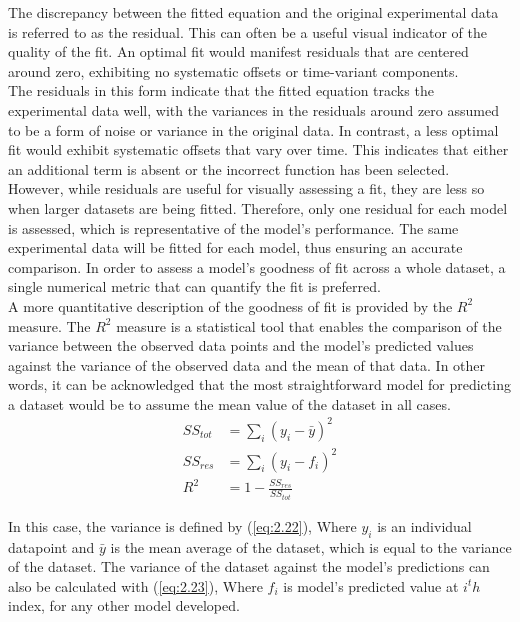 \noindent The discrepancy between the fitted equation and the original experimental data is referred to as the residual. This can often be a useful visual indicator of the quality of the fit. An optimal fit would manifest residuals that are centered around zero, exhibiting no systematic offsets or time-variant components. \\

\noindent The residuals in this form indicate that the fitted equation tracks the experimental data well, with the variances in the residuals around zero assumed to be a form of noise or variance in the original data. In contrast, a less optimal fit would exhibit systematic offsets that vary over time. This indicates that either an additional term is absent or the incorrect function has been selected. \\

\noindent However, while residuals are useful for visually assessing a fit, they are less so when larger datasets are being fitted. Therefore, only one residual for each model is assessed, which is representative of the model's performance. The same experimental data will be fitted for each model, thus ensuring an accurate comparison. In order to assess a model's goodness of fit across a whole dataset, a single numerical metric that can quantify the fit is preferred.\\

\noindent A more quantitative description of the goodness of fit is provided by the $R^2$ measure. The $R^2$ measure is a statistical tool that enables the comparison of the variance between the observed data points and the model's predicted values against the variance of the observed data and the mean of that data. In other words, it can be acknowledged that the most straightforward model for predicting a dataset would be to assume the mean value of the dataset in all cases.
\begin{align}
SS_{tot} &= \sum_{i}\left( y_i - \bar y \right)^2 \label{eq:2.22} \\
SS_{res} &= \sum_{i}\left( y_i - f_i \right)^2 \label{eq:2.23} \\
 R^2 &= 1 - \frac{SS_{res}}{SS_{tot}} \label{eq:2.24} 
\end{align}

\noindent In this case, the variance is defined by (\ref{eq:2.22}), Where $y_i$ is an individual datapoint and $\bar y$ is the mean average of the dataset, which is equal to the variance of the dataset. The variance of the dataset against the model's predictions can also be calculated with (\ref{eq:2.23}), Where $f_i$ is model’s predicted value at $i^th$ index, for any other model developed. \\

